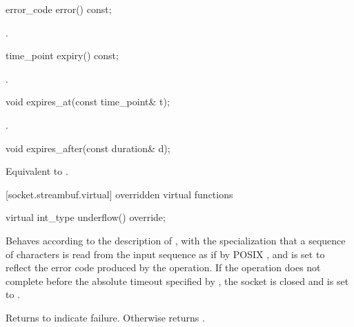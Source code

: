 \begin{itemdecl}
error_code error() const;
\end{itemdecl}

\begin{itemdescr}
\pnum
\returns {}.
\end{itemdescr}

\begin{itemdecl}
time_point expiry() const;
\end{itemdecl}

\begin{itemdescr}
\pnum
\returns {}.
\end{itemdescr}

\begin{itemdecl}
void expires_at(const time_point& t);
\end{itemdecl}

\begin{itemdescr}
\pnum
\postconditions {}.
\end{itemdescr}

\begin{itemdecl}
void expires_after(const duration& d);
\end{itemdecl}

\begin{itemdescr}
\pnum
\effects Equivalent to .
\end{itemdescr}



[socket.streambuf.virtual]{ overridden virtual functions}

\begin{itemdecl}
virtual int_type underflow() override;
\end{itemdecl}

\begin{itemdescr}
\pnum
\effects Behaves according to the description of , with the specialization that a sequence of characters is read from the input sequence as if by POSIX , and  is set to reflect the error code produced by the operation. If the operation does not complete before the absolute timeout specified by , the socket is closed and  is set to .

\pnum
\effects Returns  to indicate failure. Otherwise returns .
\end{itemdescr}

